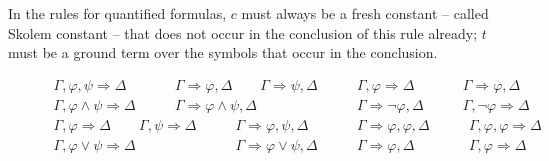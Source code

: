 \documentclass[a4paper,UKenglish]{lipics}
\begin{document}
In the rules for quantified formulas, $c$ must always be a fresh constant -- called Skolem constant -- that does not occur in the conclusion of 
this rule already; $t$ must be a ground term over the symbols that occur in the conclusion.

\begin{figure}[t]
\begin{displaymath}
\begin{array}{c}
\Gamma, \varphi, \psi \Longrightarrow \Delta \\ \hline
\Gamma, \varphi \wedge \psi \Longrightarrow \Delta
\end{array}
\qquad
\begin{array}{c}
\Gamma \Longrightarrow \varphi, \Delta \qquad \Gamma \Longrightarrow \psi, \Delta \\ \hline
\Gamma \Longrightarrow \varphi \wedge \psi, \Delta
\end{array}
\qquad
\begin{array}{c}
\Gamma, \varphi \Longrightarrow \Delta \\ \hline
\Gamma \Longrightarrow \neg\varphi, \Delta
\end{array}
\qquad
\begin{array}{c}
\Gamma \Longrightarrow \varphi, \Delta \\ \hline
\Gamma, \neg\varphi \Longrightarrow \Delta
\end{array}
\end{displaymath}
\begin{displaymath}
\begin{array}{c}
\Gamma, \varphi \Longrightarrow \Delta \qquad \Gamma, \psi \Longrightarrow \Delta \\ \hline
\Gamma, \varphi \vee \psi \Longrightarrow \Delta
\end{array}
\qquad
\begin{array}{c}
\Gamma \Longrightarrow \varphi, \psi, \Delta \\ \hline
\Gamma \Longrightarrow \varphi \vee \psi, \Delta
\end{array}
\qquad
\begin{array}{c}
\Gamma \Longrightarrow \varphi,\varphi,\Delta \\ \hline
\Gamma \Longrightarrow \varphi, \Delta
\end{array}
\qquad
\begin{array}{c}
\Gamma, \varphi, \varphi \Longrightarrow \Delta \\ \hline
\Gamma, \varphi \Longrightarrow \Delta
\end{array}

\end{displaymath}
\end{figure}
\end{document}
